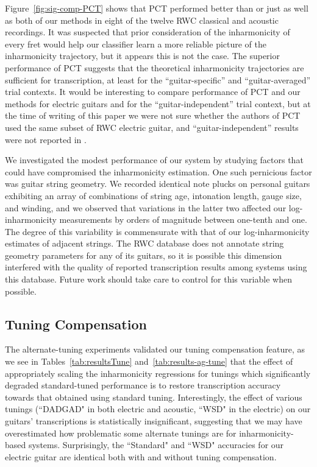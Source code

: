 \documentclass[convention,peer-reviewed]{aesconf}
\begin{document}
Figure~\ref{fig:sig-comp-PCT} shows that PCT performed better than or just as well as both of our methods in eight of the twelve RWC classical and acoustic recordings. It was suspected that prior consideration of the inharmonicity of every fret would help our classifier learn a more reliable picture of the inharmonicity trajectory, but it appears this is not the case. The superior performance of PCT suggests that the theoretical inharmonicity trajectories are sufficient for transcription, at least for the ``guitar-specific'' and ``guitar-averaged'' trial contexts. It would be interesting to compare performance of PCT and our methods for electric guitars and for the ``guitar-independent'' trial context, but at the time of writing of this paper we were not sure whether the authors of PCT used the same subset of RWC electric guitar, and ``guitar-independent'' results were not reported in \citet{barbanchoi2012}.

We investigated the modest performance of our system by studying factors that could have compromised the inharmonicity estimation. One such pernicious factor was guitar string geometry. We recorded identical note plucks on personal guitars exhibiting an array of combinations of string age, intonation length, gauge size, and winding, and we observed that variations in the latter two affected our log-inharmonicity measurements by orders of magnitude between one-tenth and one. The degree of this variability is commensurate with that of our log-inharmonicity estimates of adjacent strings. The RWC database does not annotate string geometry parameters for any of its guitars, so it is possible this dimension interfered with the quality of reported transcription results among systems using this database. Future work should take care to control for this variable when possible.

\subsection{Tuning Compensation}
The alternate-tuning experiments validated our tuning compensation feature, as we see in Tables~\ref{tab:resultsTune} and~\ref{tab:results-ag-tune} that the effect of appropriately scaling the inharmonicity regressions for tunings which significantly degraded standard-tuned performance is to restore transcription accuracy towards that obtained using standard tuning. Interestingly, the effect of various tunings (``DADGAD" in both electric and acoustic, ``WSD" in the electric) on our guitars' transcriptions is statistically insignificant, suggesting that we may have overestimated how problematic some alternate tunings are for inharmonicity-based systems. Surprisingly, the ``Standard" and ``WSD" accuracies for our electric guitar are identical both with and without tuning compensation.
\end{document}

